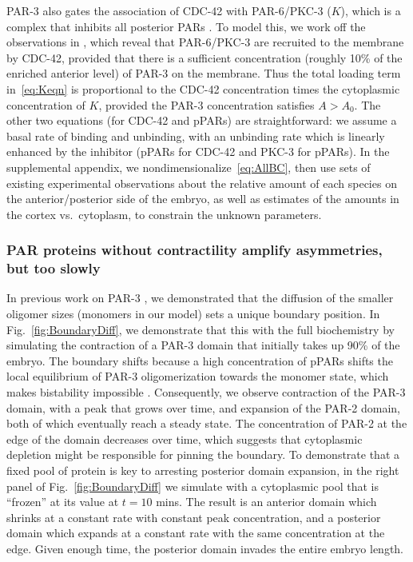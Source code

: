 \documentclass[11pt]{article}
\newcommand{\6}[1]{#1_{\text{6}}}
\newcommand{\3}[1]{#1_{\text{3}}}
\begin{document}
PAR-3 also gates the association of CDC-42 with PAR-6/PKC-3 ($K$), which is a complex that inhibits all posterior PARs \citep{lang2017proteins}. To model this, we work off the observations in \citep{sailer2015dynamic}, which reveal that PAR-6/PKC-3 are recruited to the membrane by CDC-42, provided that there is a sufficient concentration (roughly 10\% of the enriched anterior level) of PAR-3 on the membrane. Thus the total loading term in\ \eqref{eq:Keqn} is proportional to the CDC-42 concentration times the cytoplasmic concentration of $K$, provided the PAR-3 concentration satisfies $A > A_0$. The other two equations (for CDC-42 and pPARs) are straightforward: we assume a basal rate of binding and unbinding, with an unbinding rate which is linearly enhanced by the inhibitor (pPARs for CDC-42 and PKC-3 for pPARs). In the supplemental appendix, we nondimensionalize\ \eqref{eq:AllBC}, then use sets of existing experimental observations about the relative amount of each species on the anterior/posterior side of the embryo, as well as estimates of the amounts in the cortex vs.\ cytoplasm, to constrain the unknown parameters. 

\subsubsection{PAR proteins without contractility amplify asymmetries, but too slowly}

In previous work on PAR-3 \citep{lang2023oligomerization}, we demonstrated that the diffusion of the smaller oligomer sizes (monomers in our model) sets a unique boundary position. In Fig.\ \ref{fig:BoundaryDiff}, we demonstrate that this with the full biochemistry by simulating the contraction of a PAR-3 domain that initially takes up 90\% of the embryo. The boundary shifts because a high concentration of pPARs shifts the local equilibrium of PAR-3 oligomerization towards the monomer state, which makes bistability impossible \citep{lang2023oligomerization}. Consequently, we observe contraction of the PAR-3 domain, with a peak that grows over time, and expansion of the PAR-2 domain, both of which eventually reach a steady state. The concentration of PAR-2 at the edge of the domain decreases over time, which suggests that cytoplasmic depletion might be responsible for pinning the boundary. To demonstrate that a fixed pool of protein is key to arresting posterior domain expansion, in the right panel of Fig.\ \ref{fig:BoundaryDiff} we simulate with a cytoplasmic pool that is ``frozen'' at its value at $t = 10$ mins. The result is an anterior domain which shrinks at a constant rate with constant peak concentration, and a posterior domain which expands at a constant rate with the same concentration at the edge. Given enough time, the posterior domain invades the entire embryo length. 
\end{document}
